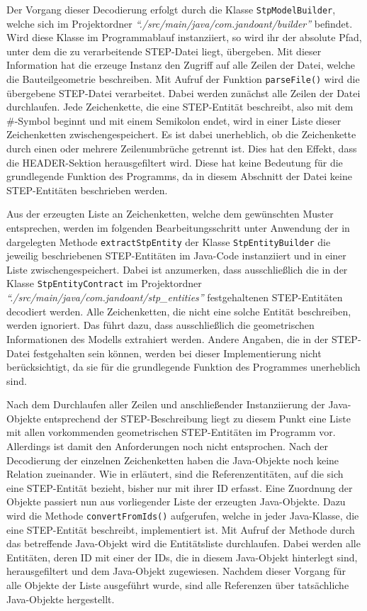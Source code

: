 Der Vorgang dieser Decodierung erfolgt durch die Klasse \verb|StpModelBuilder|, welche sich im Projektordner \textit{"`./src/main/java/com.jandoant/builder"'} befindet. 
Wird diese Klasse im Pro\-gramm\-ab\-lauf instanziiert, so wird ihr der absolute Pfad, unter dem die zu verarbeitende STEP-Datei liegt, übergeben. Mit dieser Information hat die erzeuge Instanz den Zugriff auf alle Zeilen der Datei, welche die Bauteilgeometrie beschreiben.
Mit Aufruf der Funktion \verb|parseFile()| wird die übergebene STEP-Datei verarbeitet. Dabei werden zunächst alle Zeilen der Datei durchlaufen. Jede Zeichenkette, die eine STEP-Entität beschreibt, also mit dem \#-Symbol beginnt und mit einem Semikolon endet, wird in einer Liste dieser Zeichenketten zwischengespeichert. Es ist dabei unerheblich, ob die Zeichenkette durch einen oder mehrere Zeilenumbrüche getrennt ist. Dies hat den Effekt, dass die HEADER-Sektion herausgefiltert wird. Diese hat keine Bedeutung für die grundlegende Funktion des Programms, da in diesem Abschnitt der Datei keine STEP-Entitäten beschrieben werden.

Aus der erzeugten Liste an Zeichenketten, welche dem gewünschten Muster entsprechen, werden im folgenden Bearbeitungsschritt unter Anwendung der in  dargelegten Methode \verb|extractStpEntity| der Klasse  \verb|StpEntityBuilder| die jeweilig beschriebenen STEP-Entitäten im Java-Code instanziiert und in einer Liste zwischengespeichert. Dabei ist anzumerken, dass ausschließlich die in der Klasse \verb|StpEntityContract| im Projektordner \textit{"`./src/\-main/\-java/\-com.jandoant/\-stp\_entities"'} festgehaltenen STEP-Entitäten decodiert werden. Alle Zeichenketten, die nicht eine solche Entität beschreiben, werden ignoriert. Das führt dazu, dass ausschließlich die geometrischen Informationen des Modells extrahiert werden. Andere Angaben, die in der STEP-Datei festgehalten sein können, werden bei dieser Implementierung nicht berücksichtigt, da sie für die grundlegende Funktion des Programmes unerheblich sind.

Nach dem Durchlaufen aller Zeilen und anschließender Instanziierung der Java-Objekte entsprechend der STEP-Beschreibung liegt zu diesem Punkt eine Liste mit allen vorkommenden geometrischen STEP-Entitäten im Programm vor. Allerdings ist damit den Anforderungen noch nicht entsprochen. Nach der Decodierung der einzelnen Zeichenketten haben die Java-Objekte noch keine Relation zueinander. Wie in  erläutert, sind die Referenzentitäten, auf die sich eine STEP-Entität bezieht, bisher nur mit ihrer ID erfasst. Eine Zuordnung der Objekte passiert nun aus vorliegender Liste der erzeugten Java-Objekte. 
Dazu wird die Methode \verb|convertFromIds()| aufgerufen, welche in jeder Java-Klasse, die eine STEP-Entität beschreibt, implementiert ist.
Mit Aufruf der Methode durch das betreffende Java-Objekt wird die Entitätsliste durchlaufen. Dabei werden alle Entitäten, deren ID mit einer der IDs, die in diesem Java-Objekt hinterlegt sind, herausgefiltert und dem Java-Objekt zugewiesen. Nachdem dieser Vorgang für alle Objekte der Liste ausgeführt wurde, sind alle Referenzen über tatsächliche Java-Objekte hergestellt. 

